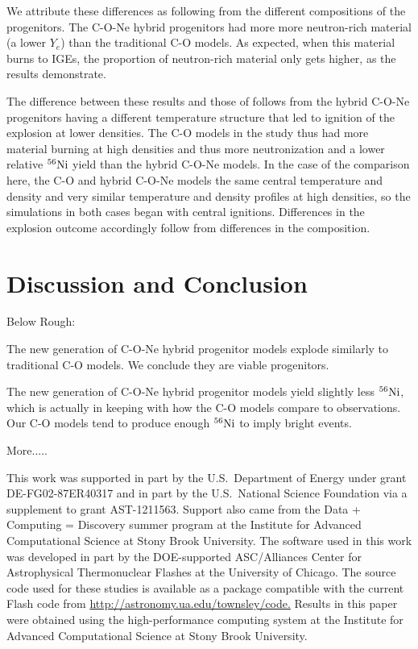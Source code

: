 \documentclass[iop,apj]{emulateapj}
\newcommand{\Ni}[1]{\ensuremath{{}^{#1}{\rm Ni}}}
\begin{document}
We attribute these differences as following from the different
compositions of the progenitors. The C-O-Ne hybrid progenitors
had more more neutron-rich material (a lower $Y_e$) than the
traditional C-O models. As expected, when this material burns
to IGEs, the proportion of neutron-rich material only gets
higher, as the results demonstrate. 

The difference between these results and those of \citet{willcoxetal2016}
follows from the hybrid C-O-Ne progenitors having a different
temperature structure that led to ignition of the explosion at lower
densities. The C-O models in the \citet{willcoxetal2016} study
thus had more material burning at high densities and thus more
neutronization and a lower relative \Ni{56} yield than the
hybrid C-O-Ne models. In the case of the comparison here, the
C-O and hybrid C-O-Ne models {\color{red} the same central 
temperature and density and very similar temperature and density 
profiles at high densities, so the simulations in both cases 
began with central ignitions. Differences in the explosion outcome 
accordingly follow from differences in the composition.}

\section{Discussion and Conclusion}

Below Rough:

The new generation of C-O-Ne hybrid progenitor models explode similarly to
traditional C-O models. We conclude they are viable progenitors. 

The new generation of C-O-Ne hybrid progenitor models yield
slightly less \Ni{56}, which is actually in keeping with how
the C-O models compare to observations. Our C-O models tend
to produce enough \Ni{56} to imply bright events. 

More.....

This work was supported in part by the U.S.\ Department of Energy under
grant DE-FG02-87ER40317 and in part by the U.S.\ National Science Foundation
via a supplement to grant AST-1211563. 
Support also came from the Data + Computing = Discovery summer program at
the Institute for Advanced Computational Science at Stony Brook University.
The software used in this work was developed in part by the DOE-supported 
ASC/Alliances Center for Astrophysical Thermonuclear Flashes at the 
University of Chicago. 
The source code used for
these studies is available as a package compatible with the
current Flash code from \url{http://astronomy.ua.edu/townsley/code.}
Results in this
paper were obtained using the high-performance computing system at the
Institute for Advanced Computational Science at Stony Brook
University. 




\end{document}
